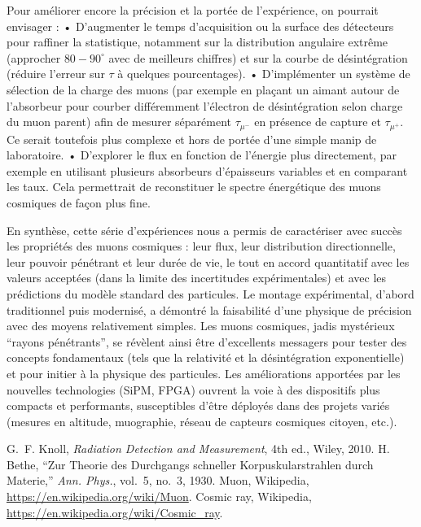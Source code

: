 \documentclass[a4paper,12pt,twoside]{article}
\begin{document}
Pour améliorer encore la précision et la portée de l’expérience, on pourrait envisager :
	•	D’augmenter le temps d’acquisition ou la surface des détecteurs pour raffiner la statistique, notamment sur la distribution angulaire extrême (approcher $80-90^\circ$ avec de meilleurs chiffres) et sur la courbe de désintégration (réduire l’erreur sur $\tau$ à quelques pourcentages).
	•	D’implémenter un système de sélection de la charge des muons (par exemple en plaçant un aimant autour de l’absorbeur pour courber différemment l’électron de désintégration selon charge du muon parent) afin de mesurer séparément $\tau_{\mu^-}$ en présence de capture et $\tau_{\mu^+}$. Ce serait toutefois plus complexe et hors de portée d’une simple manip de laboratoire.
	•	D’explorer le flux en fonction de l’énergie plus directement, par exemple en utilisant plusieurs absorbeurs d’épaisseurs variables et en comparant les taux. Cela permettrait de reconstituer le spectre énergétique des muons cosmiques de façon plus fine.

En synthèse, cette série d’expériences nous a permis de caractériser avec succès les propriétés des muons cosmiques : leur flux, leur distribution directionnelle, leur pouvoir pénétrant et leur durée de vie, le tout en accord quantitatif avec les valeurs acceptées (dans la limite des incertitudes expérimentales) et avec les prédictions du modèle standard des particules. Le montage expérimental, d’abord traditionnel puis modernisé, a démontré la faisabilité d’une physique de précision avec des moyens relativement simples. Les muons cosmiques, jadis mystérieux “rayons pénétrants”, se révèlent ainsi être d’excellents messagers pour tester des concepts fondamentaux (tels que la relativité et la désintégration exponentielle) et pour initier à la physique des particules. Les améliorations apportées par les nouvelles technologies (SiPM, FPGA) ouvrent la voie à des dispositifs plus compacts et performants, susceptibles d’être déployés dans des projets variés (mesures en altitude, muographie, réseau de capteurs cosmiques citoyen, etc.).

\begin{thebibliography}{9}
 G.~F. Knoll, \emph{Radiation Detection and Measurement}, 4th ed., Wiley, 2010.
 H. Bethe, ``Zur Theorie des Durchgangs schneller Korpuskularstrahlen durch Materie,'' \emph{Ann. Phys.}, vol.~5, no.~3, 1930.
 Muon, Wikipedia, \url{https://en.wikipedia.org/wiki/Muon}.
 Cosmic ray, Wikipedia, \url{https://en.wikipedia.org/wiki/Cosmic_ray}.
\end{thebibliography}
\end{document}
